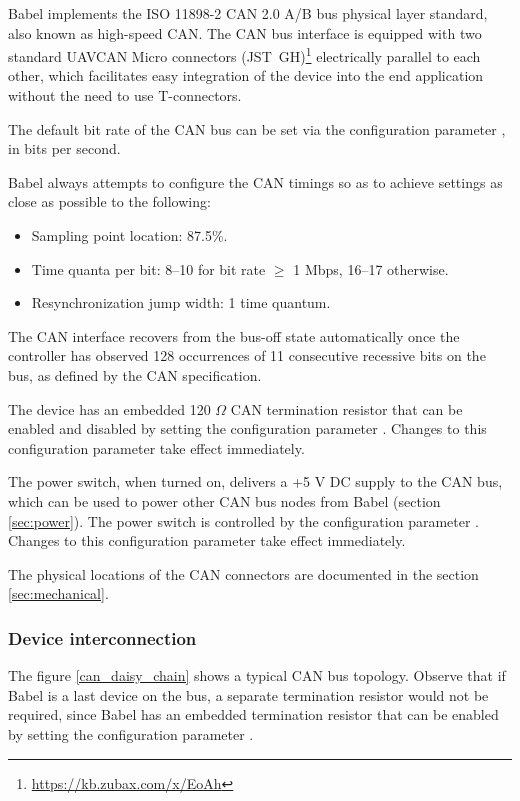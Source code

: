 \documentclass{zubaxdoc}
\begin{document}
Babel implements the ISO 11898-2 CAN 2.0 A/B bus physical layer standard, also known as high-speed CAN.
The CAN bus interface is equipped with two standard
UAVCAN Micro connectors (JST~GH)\footnote{\url{https://kb.zubax.com/x/EoAh}}
electrically parallel to each other,
which facilitates easy integration of the device into the end application without the need to use T-connectors.

The default bit rate of the CAN bus can be set via the configuration parameter ,
in bits per second.

Babel always attempts to configure the CAN timings so as to achieve settings as close as possible to the
following:
\begin{itemize}
    \item Sampling point location: 87.5\%.
    \item Time quanta per bit: 8--10 for bit rate $\geq$ 1 Mbps, 16--17 otherwise.
    \item Resynchronization jump width: 1 time quantum.
\end{itemize}

The CAN interface recovers from the bus-off state automatically once the controller has
observed 128 occurrences of 11 consecutive recessive bits on the bus, as defined by the CAN specification.

The device has an embedded 120 $\Omega$ CAN termination resistor that can be enabled and disabled
by setting the configuration parameter .
Changes to this configuration parameter take effect immediately.

The power switch, when turned on, delivers a +5 V DC supply to the CAN bus,
which can be used to power other CAN bus nodes from Babel
(section \ref{sec:power}).
The power switch is controlled by the configuration parameter .
Changes to this configuration parameter take effect immediately.

The physical locations of the CAN connectors are documented in the section \ref{sec:mechanical}.

\subsubsection{Device interconnection}

The figure \ref{can_daisy_chain} shows a typical CAN bus topology.
Observe that if Babel is a last device on the bus, a separate termination resistor would not be required,
since Babel has an embedded termination resistor that can be enabled by setting the configuration
parameter .
\end{document}
